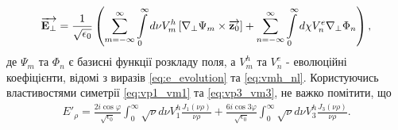 \begin{equation} \begin{aligned}
\overrightarrow{\mathbf E_\perp} = \frac{1}{\sqrt{\epsilon_0}} \left( 
\sum \limits_{m=-\infty}^{\infty} \int \limits_{0}^{\infty} 
d \nu V_m^h \left[  \nabla_\perp \Psi_m  \times  \overrightarrow{\mathbf z_0}  \right] +
\sum \limits_{n=-\infty}^{\infty} \int \limits_{0}^{\infty}
d \chi V_n^e \nabla_\perp \Phi_n \right),
\end{aligned} \end{equation}
%
де $ \Psi_m $ та $ \Phi_n  $ є базисні функції розкладу поля, а $ V_m^h $
та $ V_n^e $ - еволюційні коефіцієнти, відомі з виразів \eqref{eq:e_evolution}
та \eqref{eq:vmh_nl}. Користуючись властивостями симетрії 
\eqref{eq:vp1_vm1} та \eqref{eq:vp3_vm3}, не важко помітити, що
%
%
%
%
\begin{equation} \begin{aligned}
E'_\rho = \frac{2 i \cos \varphi}{\sqrt{\epsilon_0}}
\int_0^\infty \sqrt{\nu} d \nu V_1^h \frac{J_1(\nu \rho)}{\nu \rho} +
\frac{6 i \cos 3 \varphi}{\sqrt{\epsilon_0}}
\int_0^\infty \sqrt{\nu} d \nu V_3^h \frac{J_3(\nu \rho)}{\nu \rho}.
\end{aligned} \end{equation}


